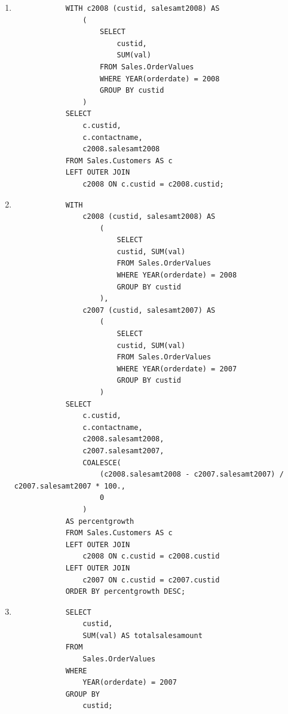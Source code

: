 \documentclass[12pt,titlepage]{article}
\begin{document}
\begin{enumerate}
{    }
    \item {
        \begin{verbatim}
            WITH c2008 (custid, salesamt2008) AS
                (
                    SELECT
                        custid,
                        SUM(val)
                    FROM Sales.OrderValues
                    WHERE YEAR(orderdate) = 2008
                    GROUP BY custid
                )
            SELECT
                c.custid,
                c.contactname,
                c2008.salesamt2008
            FROM Sales.Customers AS c
            LEFT OUTER JOIN
                c2008 ON c.custid = c2008.custid;
        \end{verbatim}
    }
    \item {
        \begin{verbatim}
            WITH 
                c2008 (custid, salesamt2008) AS
                    (
                        SELECT
                        custid, SUM(val)
                        FROM Sales.OrderValues
                        WHERE YEAR(orderdate) = 2008
                        GROUP BY custid
                    ),
                c2007 (custid, salesamt2007) AS
                    (
                        SELECT
                        custid, SUM(val)
                        FROM Sales.OrderValues
                        WHERE YEAR(orderdate) = 2007
                        GROUP BY custid
                    )
            SELECT
                c.custid, 
                c.contactname,
                c2008.salesamt2008,
                c2007.salesamt2007,
                COALESCE(
                    (c2008.salesamt2008 - c2007.salesamt2007) / c2007.salesamt2007 * 100.,
                    0
                )
            AS percentgrowth
            FROM Sales.Customers AS c
            LEFT OUTER JOIN
                c2008 ON c.custid = c2008.custid
            LEFT OUTER JOIN
                c2007 ON c.custid = c2007.custid
            ORDER BY percentgrowth DESC;
        \end{verbatim}
    }
    \item {
        \begin{verbatim}
            SELECT
                custid,
                SUM(val) AS totalsalesamount
            FROM 
                Sales.OrderValues
            WHERE
                YEAR(orderdate) = 2007
            GROUP BY
                custid;
        \end{verbatim}
}
\end{enumerate}
\end{document}
